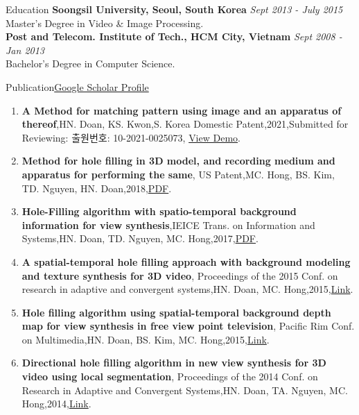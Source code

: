 \documentclass{resume}
\begin{document}
	\begin{rSection}{Education}
		{\bf Soongsil University, Seoul, South Korea} \hfill {\em Sept 2013 - July 2015} \\  {Master's Degree in Video \& Image Processing.} \smallskip \\
		{\bf Post and Telecom. Institute of Tech., HCM City, Vietnam} \hfill {\em Sept 2008 - Jan 2013} \\  {Bachelor's Degree in Computer Science.}
	\end{rSection}

	\begin{rSection}{Publication}\href{https://scholar.google.co.kr/citations?user=nhm8WBMAAAAJ&hl=en}{Google Scholar Profile}
	\begin{enumerate}[leftmargin=*]
		\item {\bf A Method for matching pattern using image and an apparatus of thereof},{HN. Doan, KS. Kwon},{S. Korea Domestic Patent},{2021},{Submitted for Reviewing: 출원번호: 10-2021-0025073}, \href{https://blog.naver.com/mvtech_ravid/222119961697}{View Demo}.
		\item {\bf Method for hole filling in 3D model, and recording medium and apparatus for performing the same},{ US Patent},{MC. Hong, BS. Kim, TD. Nguyen, HN. Doan},{2018},\href{https://patentimages.storage.googleapis.com/d5/ab/0a/111cb20d160a96/US9916694.pdf}{PDF}.
		\item {\bf Hole-Filling algorithm with spatio-temporal background information for view synthesis},{IEICE Trans. on Information and Systems},{HN. Doan, TD. Nguyen, MC. Hong},{2017},\href{https://www.jstage.jst.go.jp/article/transinf/E100.D/9/E100.D_2016PCP0010/_pdf}{PDF}.
		\item {\bf A spatial-temporal hole filling approach with background modeling and texture synthesis for 3D video},{ Proceedings of the 2015 Conf.  on research in adaptive and convergent systems},{HN. Doan, MC. Hong},{2015},\href{https://dl.acm.org/doi/abs/10.1145/2811411.2811497}{Link}.
		\item {\bf Hole filling algorithm using spatial-temporal background depth map for view synthesis in free view point television},{ Pacific Rim Conf.  on Multimedia},{HN. Doan, BS. Kim, MC. Hong},{2015},\href{https://link.springer.com/chapter/10.1007/978-3-319-24078-7_61}{Link}.
 		\item {\bf Directional hole filling algorithm in new view synthesis for 3D video using local segmentation},{ Proceedings of the 2014 Conf.  on Research in Adaptive and Convergent Systems},{HN. Doan, TA. Nguyen, MC. Hong},{2014},\href{https://dl.acm.org/doi/abs/10.1145/2663761.2664229}{Link}.
	\end{enumerate}	
\end{rSection}
\end{document}
